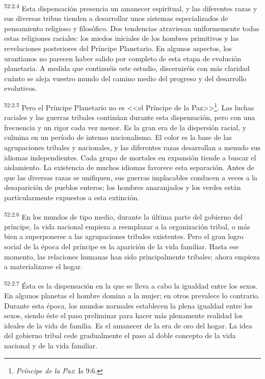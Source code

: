 \par
\textsuperscript{52:2.4} Esta dispensación presencia un amanecer espiritual, y las diferentes razas y sus diversas tribus tienden a desarrollar unos sistemas especializados de pensamiento religioso y filosófico. Dos tendencias atraviesan uniformemente todas estas religiones raciales: los miedos iniciales de los hombres primitivos y las revelaciones posteriores del Príncipe Planetario. En algunos aspectos, los urantianos no parecen haber salido por completo de esta etapa de evolución planetaria. A medida que continuéis este estudio, discerniréis con más claridad cuánto se aleja vuestro mundo del camino medio del progreso y del desarrollo evolutivos.

\par
\textsuperscript{52:2.5} Pero el Príncipe Planetario no es <<el Príncipe de la Paz>>\footnote{\textit{Príncipe de la Paz}: Is 9:6.}. Las luchas raciales y las guerras tribales continúan durante esta dispensación, pero con una frecuencia y un rigor cada vez menor. Es la gran era de la dispersión racial, y culmina en un período de intenso nacionalismo. El color es la base de las agrupaciones tribales y nacionales, y las diferentes razas desarrollan a menudo sus idiomas independientes. Cada grupo de mortales en expansión tiende a buscar el aislamiento. La existencia de muchos idiomas favorece esta separación. Antes de que las diversas razas se unifiquen, sus guerras implacables conducen a veces a la desaparición de pueblos enteros; los hombres anaranjados y los verdes están particularmente expuestos a esta extinción.

\par
\textsuperscript{52:2.6} En los mundos de tipo medio, durante la última parte del gobierno del príncipe, la vida nacional empieza a reemplazar a la organización tribal, o más bien a superponerse a las agrupaciones tribales existentes. Pero el gran logro social de la época del príncipe es la aparición de la vida familiar. Hasta ese momento, las relaciones humanas han sido principalmente tribales; ahora empieza a materializarse el hogar.

\par
\textsuperscript{52:2.7} Ésta es la dispensación en la que se lleva a cabo la igualdad entre los sexos. En algunos planetas el hombre domina a la mujer; en otros prevalece lo contrario. Durante esta época, los mundos normales establecen la plena igualdad entre los sexos, siendo éste el paso preliminar para hacer más plenamente realidad los ideales de la vida de familia. Es el amanecer de la era de oro del hogar. La idea del gobierno tribal cede gradualmente el paso al doble concepto de la vida nacional y de la vida familiar.

